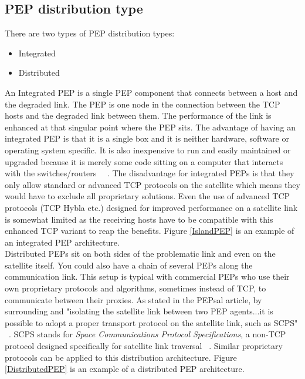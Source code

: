 \subsection{PEP distribution type}
There are two types of PEP distribution types:\\
\begin{itemize}
\item Integrated 
\item Distributed\\
\end{itemize}
An Integrated PEP is a single PEP component that connects between a host and the degraded link. The PEP is one node in the connection between the TCP hosts and the degraded link between them. The performance of the link is enhanced at that singular point where the PEP sits. The advantage of having an integrated PEP is that it is a single box and it is neither hardware, software or operating system specific. It is also inexpensive to run and easily maintained or upgraded because it is merely some code sitting on a computer that interacts with the switches/routers ~\cite{6}~\cite{14}. The disadvantage for integrated PEPs is that they only allow standard or advanced TCP protocols on the satellite which means they would have to exclude all proprietary solutions. Even the use of advanced TCP protocols (TCP Hybla etc.) designed for improved performance on a satellite link is somewhat limited as the receiving hosts have to be compatible with this enhanced TCP variant to reap the benefits. Figure \ref{IslandPEP} is an example of an integrated PEP architecture.\\

Distributed PEPs sit on both sides of the problematic link and even on the satellite itself. You could also have a chain of several PEPs along the communication link. This setup is typical with commercial PEPs who use their own proprietary protocols and algorithms, sometimes instead of TCP, to communicate between their proxies. As stated in the PEPsal article, by surrounding and "isolating the satellite link between two PEP agents...it is possible to adopt a proper transport protocol on the satellite link, such as SCPS" ~\cite{14}. SCPS stands for \emph{Space Communications Protocol Specifications}, a non-TCP protocol designed specifically for satellite link traversal ~\cite{11}. Similar proprietary protocols can be applied to this distribution architecture. Figure \ref{DistributedPEP} is an example of a distributed PEP architecture.\\

